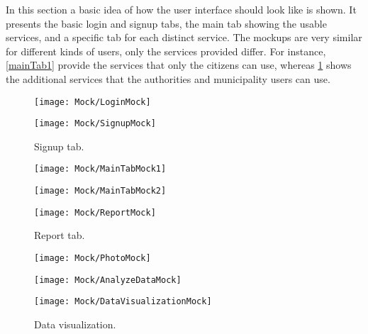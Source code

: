 In this section a basic idea of how the user interface should look like is shown. It presents the basic login and signup tabs, the main tab showing the usable services, and a specific tab for each distinct service. The mockups are very similar for different kinds of users, only the services provided differ. For instance, \ref{mainTab1} provide the services that only the citizens can use, whereas \ref{mainTab2} shows the additional services that the authorities and municipality users can use.

\begin{figure}[H]
	\centering
	\begin{minipage}[b]{.35\linewidth}	    \texttt{[image: Mock/LoginMock]}
	    \caption{Login tab.}
	\end{minipage}
	\begin{minipage}[b]{0.35\linewidth}
	    \texttt{[image: Mock/SignupMock]}
	    \caption{Signup tab.}
	\end{minipage}
\end{figure}
\begin{figure}[H]
	\centering
	\begin{minipage}[b]{0.4\linewidth}
	    \texttt{[image: Mock/MainTabMock1]}
	    \caption{Main tab 1.}
	    \label{mainTab1}
	\end{minipage}
	\begin{minipage}[b]{0.4\linewidth}
	    \texttt{[image: Mock/MainTabMock2]}
	    \caption{Main tab 2.}
	    \label{mainTab2}
	\end{minipage}
	\begin{minipage}[b]{0.4\linewidth}
	    \texttt{[image: Mock/ReportMock]}
	    \caption{Report tab.}
	\end{minipage}
\end{figure}
\begin{figure}[H]
	\centering
	\begin{minipage}[b]{0.6\linewidth}
	    \texttt{[image: Mock/PhotoMock]}
    \caption{Violation photo.}
	\end{minipage}
	\begin{minipage}[b]{0.4\linewidth}
	    \texttt{[image: Mock/AnalyzeDataMock]}
	    \caption{Analyze data.}
	\end{minipage}
	\begin{minipage}[b]{0.4\linewidth}
	    \texttt{[image: Mock/DataVisualizationMock]}
	    \caption{Data visualization.}
	\end{minipage}
\end{figure}

